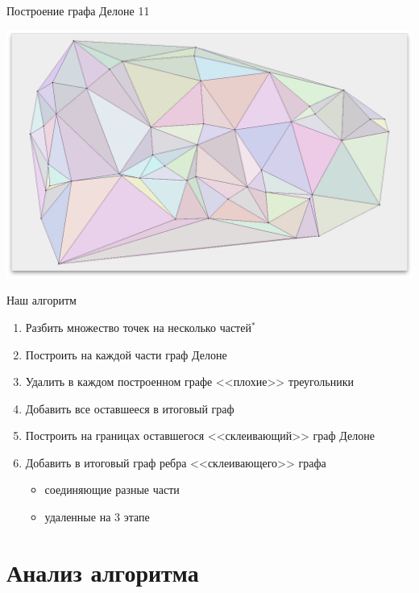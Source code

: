 \documentclass[14pt, fleqn, xcolor={dvipsnames, table}]{beamer}
\begin{document}
        
        \begin{frame}{Построение графа Делоне 11}
            \begin{center}
                \includegraphics[scale=0.295]{11.png}
            \end{center}             
        \end{frame} 
        
        \begin{frame}{Наш алгоритм}
            \begin{enumerate}
                \item Разбить множество точек на несколько частей$^*$
                \item Построить на каждой части граф Делоне
                \item Удалить в каждом построенном графе <<плохие>> треугольники
                \item Добавить все оставшееся в итоговый граф 
                \item Построить на границах оставшегося <<склеивающий>> граф Делоне
                \item Добавить в итоговый граф ребра <<склеивающего>> графа
                    \begin{itemize}
                        \item соединяющие разные части
                        \item удаленные на 3 этапе
                    \end{itemize} 
            \end{enumerate}                       
        \end{frame}
        
    \section{Анализ алгоритма} 
        
\end{document}
